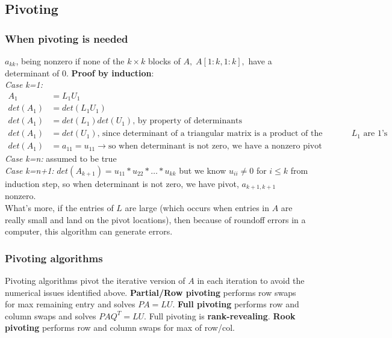 \documentclass{article}
\begin{document}
\begin{itemize}
{%
\subsection{Pivoting}
\subsubsection{When pivoting is needed}
$a_{kk}$, being nonzero if none of the $k \times k$ blocks of $A, \; A[1:k, 1:k],$ have a determinant of 0. \textbf{Proof by induction}:\\
\textit{Case k=1:} 
\begin{align*}
    A_1 &= L_1U_1\\
    det(A_1) &= det(L_1U_1)\\
    det(A_1) &= det(L_1)det(U_1) \textrm{, by property of determinants}\\
    det(A_1) &= det(U_1) \textrm{, since determinant of a triangular matrix is a product of the diagonals and the diagonal of $L_1$ are 1's}\\
    det(A_1) &= a_{11} = u_{11} \rightarrow \textrm{so when determinant is not zero, we have a nonzero pivot}
\end{align*}
\textit{Case k=n:} assumed to be true\\
\textit{Case k=n+1:} $det(A_{k+1}) = u_{11}*u_{22}*\dots*u_{kk}$ but we know $u_{ii} \neq 0$ for $i \leq k$ from induction step, so when determinant is not zero, we have pivot, $a_{k+1, k+1}$ nonzero. \\
What's more, if the entries of $L$ are large (which occurs when entries in $A$ are really small and land on the pivot locations), then because of roundoff errors in a computer, this algorithm can generate errors.


\subsubsection{Pivoting algorithms}
Pivoting algorithms pivot the iterative version of $A$ in each iteration to avoid the numerical issues identified above. \textbf{Partial/Row pivoting} performs row swaps for max remaining entry and solves $PA = LU$. \textbf{Full pivoting} performs row and column swaps and solves $PAQ^T = LU$. Full pivoting is \textbf{rank-revealing}. \textbf{Rook pivoting} performs row and column swaps for max of row/col.


}
\end{itemize}
\end{document}
